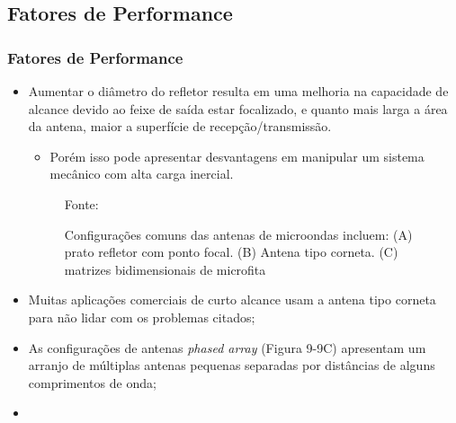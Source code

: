 \documentclass[xcolor=dvipsnames, aspectratio=169]{beamer}
\begin{document}
    \subsection[Fatores de Performance]{Fatores de Performance} 
    \begin{frame}
    \frametitle{Fatores de Performance}
        \begin{itemize}
            \item Aumentar o diâmetro do refletor resulta em uma melhoria na capacidade de alcance devido ao feixe de saída estar focalizado, e quanto mais larga a área da antena, maior a superfície de recepção/transmissão.
            \begin{itemize}
                \item Porém isso pode apresentar desvantagens em manipular um sistema mecânico com alta carga inercial.
            \end{itemize}
            		
		\begin{figure}
            \centering
            {Fonte: \cite{everett1995sensors}}
            \caption{Configurações comuns das antenas de microondas incluem: (A) prato refletor com ponto focal. (B) Antena tipo corneta. (C) matrizes bidimensionais de microfita}
            \label{fig:curva_de_freq}
        \end{figure}
        
        \item Muitas aplicações comerciais de curto alcance usam a antena tipo corneta para não lidar com os problemas citados;
        \item As configurações de antenas \textit{phased array} (Figura 9-9C) apresentam um arranjo de múltiplas antenas pequenas separadas por distâncias de alguns comprimentos de onda;
        \item 
        \end{itemize}
    \end{frame}

\end{document}

